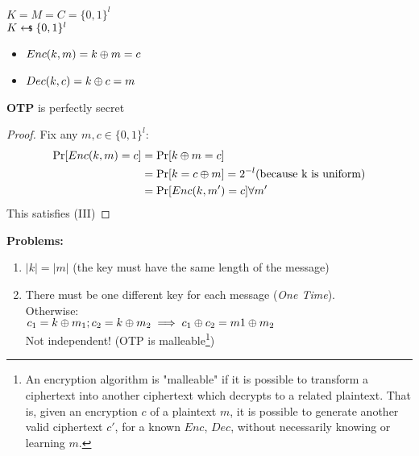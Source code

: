 $K=M=C=\{0,1\}^l$\\
$K\pickUAR \{0,1\}^l$
\begin{itemize}
    \item $Enc(k,m)=k\oplus m=c$
    \item $Dec(k,c)=k\oplus c=m$
\end{itemize}
\begin{theorem}
    \textbf{OTP} is perfectly secret
\end{theorem}
\begin{proof}
    Fix any $m,c \in \{0,1\}^l$:
    \begin{align*}
        \Pr[Enc(k,m)=c] &= \Pr[k\oplus m=c] \\
        &= \Pr[k=c\oplus m]=2^{-l} \text{(because k is uniform)} \\
        &= \Pr[Enc(k,m')=c] \forall m'    
    \end{align*}
    This satisfies (III)
\end{proof}

\textbf{Problems:}
\begin{enumerate}
    \item $|k|=|m|$ (the key must have the same length of the message)
    \item There must be one different key for each message (\textit{One Time}).\\Otherwise:\\
    $c_1=k\oplus m_1; c_2=k \oplus m_2 \implies c_1\oplus c_2=m1\oplus m_2$\\
    Not independent! (OTP is malleable\footnote{An encryption algorithm is "malleable" if it is possible to transform a ciphertext into another ciphertext which decrypts to a related plaintext. That is, given an encryption $c$ of a plaintext $m$, it is possible to generate another valid ciphertext $c'$, for a known $Enc$, $Dec$, without necessarily knowing or learning $m$. })
\end{enumerate}

